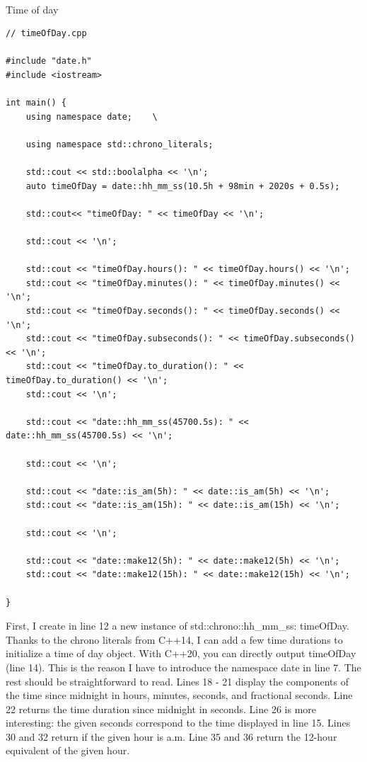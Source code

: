 \hspace*{\fill} \\ %
\noindent
Time of day
\begin{lstlisting}[style=styleCXX]
// timeOfDay.cpp

#include "date.h"
#include <iostream>

int main() {
	using namespace date;    \
	
	using namespace std::chrono_literals;
	
	std::cout << std::boolalpha << '\n';
	auto timeOfDay = date::hh_mm_ss(10.5h + 98min + 2020s + 0.5s);
	
	std::cout<< "timeOfDay: " << timeOfDay << '\n';
	
	std::cout << '\n';
	
	std::cout << "timeOfDay.hours(): " << timeOfDay.hours() << '\n';
	std::cout << "timeOfDay.minutes(): " << timeOfDay.minutes() << '\n';
	std::cout << "timeOfDay.seconds(): " << timeOfDay.seconds() << '\n';
	std::cout << "timeOfDay.subseconds(): " << timeOfDay.subseconds() << '\n';
	std::cout << "timeOfDay.to_duration(): " << timeOfDay.to_duration() << '\n';
	std::cout << '\n';
	
	std::cout << "date::hh_mm_ss(45700.5s): " << date::hh_mm_ss(45700.5s) << '\n';
	
	std::cout << '\n';
	
	std::cout << "date::is_am(5h): " << date::is_am(5h) << '\n';
	std::cout << "date::is_am(15h): " << date::is_am(15h) << '\n';
	
	std::cout << '\n';
	
	std::cout << "date::make12(5h): " << date::make12(5h) << '\n';
	std::cout << "date::make12(15h): " << date::make12(15h) << '\n';

}
\end{lstlisting}

First, I create in line 12 a new instance of std::chrono::hh\_mm\_ss: timeOfDay. Thanks to the chrono literals from C++14, I can add a few time durations to initialize a time of day object. With C++20, you can directly output timeOfDay (line 14). This is the reason I have to introduce the namespace date in line 7. The rest should be straightforward to read. Lines 18 - 21 display the components of the time since midnight in hours, minutes, seconds, and fractional seconds. Line 22 returns the time duration since midnight in seconds. Line 26 is more interesting: the given seconds correspond to the time displayed in line 15. Lines 30 and 32 return if the given hour is a.m. Line 35 and 36 return the 12-hour equivalent of the given hour.

